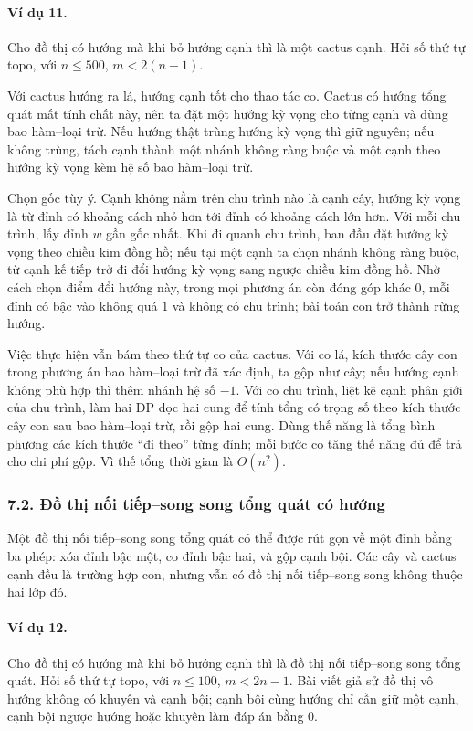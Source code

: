 \documentclass[11pt]{article}
\begin{document}
\paragraph{Ví dụ 11.}
Cho đồ thị có hướng mà khi bỏ hướng cạnh thì là một cactus cạnh. Hỏi số thứ tự
topo, với \(n\le 500\), \(m<2(n-1)\).

Với cactus hướng ra lá, hướng cạnh tốt cho thao tác co. Cactus có hướng tổng
quát mất tính chất này, nên ta đặt một hướng kỳ vọng cho từng cạnh và dùng
bao hàm--loại trừ. Nếu hướng thật trùng hướng kỳ vọng thì giữ nguyên; nếu không
trùng, tách cạnh thành một nhánh không ràng buộc và một cạnh theo hướng kỳ vọng
kèm hệ số bao hàm--loại trừ.

Chọn gốc tùy ý. Cạnh không nằm trên chu trình nào là cạnh cây, hướng kỳ vọng là
từ đỉnh có khoảng cách nhỏ hơn tới đỉnh có khoảng cách lớn hơn. Với mỗi chu
trình, lấy đỉnh \(w\) gần gốc nhất. Khi đi quanh chu trình, ban đầu đặt hướng
kỳ vọng theo chiều kim đồng hồ; nếu tại một cạnh ta chọn nhánh không ràng buộc,
từ cạnh kế tiếp trở đi đổi hướng kỳ vọng sang ngược chiều kim đồng hồ. Nhờ cách
chọn điểm đổi hướng này, trong mọi phương án còn đóng góp khác \(0\), mỗi đỉnh
có bậc vào không quá \(1\) và không có chu trình; bài toán con trở thành rừng
hướng.

Việc thực hiện vẫn bám theo thứ tự co của cactus. Với co lá, kích thước cây con
trong phương án bao hàm--loại trừ đã xác định, ta gộp như cây; nếu hướng cạnh
không phù hợp thì thêm nhánh hệ số \(-1\). Với co chu trình, liệt kê cạnh phân
giới của chu trình, làm hai DP dọc hai cung để tính tổng có trọng số theo kích
thước cây con sau bao hàm--loại trừ, rồi gộp hai cung. Dùng thế năng là tổng
bình phương các kích thước ``đi theo'' từng đỉnh; mỗi bước co tăng thế năng đủ
để trả cho chi phí gộp. Vì thế tổng thời gian là \(O(n^2)\).

\subsubsection*{7.2. Đồ thị nối tiếp--song song tổng quát có hướng}

Một đồ thị nối tiếp--song song tổng quát có thể được rút gọn về một đỉnh bằng
ba phép: xóa đỉnh bậc một, co đỉnh bậc hai, và gộp cạnh bội. Các cây và cactus
cạnh đều là trường hợp con, nhưng vẫn có đồ thị nối tiếp--song song không thuộc
hai lớp đó.

\paragraph{Ví dụ 12.}
Cho đồ thị có hướng mà khi bỏ hướng cạnh thì là đồ thị nối tiếp--song song tổng
quát. Hỏi số thứ tự topo, với \(n\le 100\), \(m<2n-1\). Bài viết giả sử đồ thị
vô hướng không có khuyên và cạnh bội; cạnh bội cùng hướng chỉ cần giữ một cạnh,
cạnh bội ngược hướng hoặc khuyên làm đáp án bằng \(0\).
\end{document}

